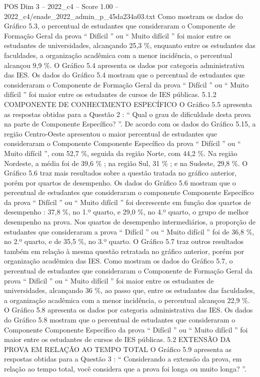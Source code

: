 \begin{textsample}{POS Dim 3 – 2022\_c4 – Score 1.00 – 2022\_c4/enade\_2022\_admin\_p\_45da234a03.txt}
Como mostram os dados do Gráfico 5.3, o percentual de estudantes que consideraram o Componente de Formação Geral da prova “ Difícil ” ou “ Muito difícil ” foi maior entre os estudantes de universidades, alcançando 25,3 \%, enquanto entre os estudantes das faculdades, a organização acadêmica com a menor incidência, o percentual alcançou 9,9 \%.
O Gráfico 5.4 apresenta os dados por categoria administrativa das IES.
Os dados do Gráfico 5.4 mostram que o percentual de estudantes que consideraram o Componente de Formação Geral da prova “ Difícil ” ou “ Muito difícil ” foi maior entre os estudantes de cursos de IES públicas. 5.1.2 COMPONENTE DE CONHECIMENTO ESPECÍFICO O Gráfico 5.5 apresenta as respostas obtidas para a Questão 2 : “ Qual o grau de dificuldade desta prova na parte de Componente Específico? ”.
De acordo com os dados do Gráfico 5.15, a região Centro-Oeste apresentou o maior percentual de estudantes que consideraram o Componente Componente Específico da prova “ Difícil ” ou “ Muito difícil ”, com 52,7 \%, seguida da região Norte, com 44,2 \%.
Na região Nordeste, a média foi de 39,6 \% ; na região Sul, 31 \% ; e na Sudeste, 29,8 \%.
O Gráfico 5.6 traz mais resultados sobre a questão tratada no gráfico anterior, porém por quartos de desempenho.
Os dados do Gráfico 5.6 mostram que o percentual de estudantes que consideraram o componente Componente Específico da prova “ Difícil ” ou “ Muito difícil ” foi decrescente em função dos quartos de desempenho : 37,8 \%, no 1.º quarto, e 29,0 \%, no 4.º quarto, o grupo de melhor desempenho na prova.
Nos quartos de desempenho intermediários, a proporção de estudantes que consideraram a prova “ Difícil ” ou “ Muito difícil ” foi de 36,8 \%, no 2.º quarto, e de 35,5 \%, no 3.º quarto.
O Gráfico 5.7 traz outros resultados também em relação à mesma questão retratada no gráfico anterior, porém por organização acadêmica das IES.
Como mostram os dados do Gráfico 5.7, o percentual de estudantes que consideraram o Componente de Formação Geral da prova “ Difícil ” ou “ Muito difícil ” foi maior entre os estudantes de universidades, alcançando 36 \%, ao passo que, entre os estudantes das faculdades, a organização acadêmica com a menor incidência, o percentual alcançou 22,9 \%.
O Gráfico 5.8 apresenta os dados por categoria administrativa das IES.
Os dados do Gráfico 5.8 mostram que o percentual de estudantes que consideraram o Componente Componente Específico da prova “ Difícil ” ou “ Muito difícil ” foi maior entre os estudantes de cursos de IES públicas. 5.2 EXTENSÃO DA PROVA EM RELAÇÃO AO TEMPO TOTAL O Gráfico 5.9 apresenta as respostas obtidas para a Questão 3 : “ Considerando a extensão da prova, em relação ao tempo total, você considera que a prova foi longa ou muito longa? ”.

\end{textsample}
